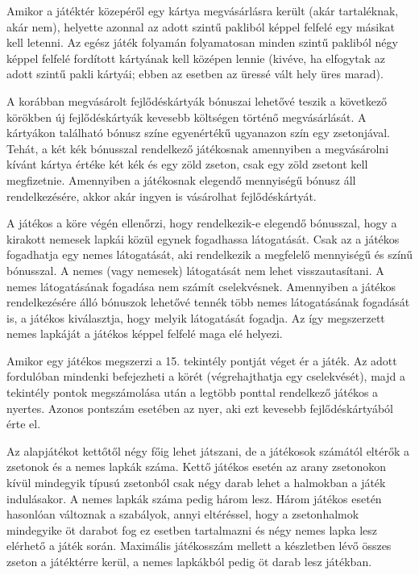 Amikor a játéktér közepéről egy kártya megvásárlásra került (akár tartaléknak, akár nem), helyette azonnal az adott szintű pakliból képpel felfelé egy másikat kell letenni. Az egész játék folyamán folyamatosan minden szintű pakliból négy képpel felfelé fordított kártyának kell középen lennie (kivéve, ha elfogytak az adott szintű pakli kártyái; ebben az esetben az üressé vált hely üres marad).


A korábban megvásárolt fejlődéskártyák bónuszai lehetővé teszik a következő körökben új fejlődéskártyák kevesebb költségen történő megvásárlását. A kártyákon található bónusz színe egyenértékű ugyanazon szín egy zsetonjával. Tehát, a két kék bónusszal rendelkező játékosnak amennyiben a megvásárolni kívánt kártya értéke két kék és egy zöld zseton, csak egy zöld zsetont kell megfizetnie. Amennyiben a játékosnak elegendő mennyiségű bónusz áll rendelkezésére, akkor akár ingyen is vásárolhat fejlődéskártyát.


A játékos a köre végén ellenőrzi, hogy rendelkezik-e elegendő bónusszal, hogy a kirakott nemesek lapkái közül egynek fogadhassa látogatását. Csak az a játékos fogadhatja egy nemes látogatását, aki rendelkezik a megfelelő mennyiségű és színű bónusszal. A nemes (vagy nemesek) látogatását nem lehet visszautasítani. A nemes látogatásának fogadása nem számít cselekvésnek. Amennyiben a játékos rendelkezésére álló bónuszok lehetővé tennék több nemes látogatásának fogadását is, a játékos kiválasztja, hogy melyik látogatását fogadja. Az így megszerzett nemes lapkáját a játékos képpel felfelé maga elé helyezi.


Amikor egy játékos megszerzi a 15. tekintély pontját véget ér a játék. Az adott fordulóban mindenki befejezheti a körét (végrehajthatja egy cselekvését), majd a tekintély pontok megszámolása után a legtöbb ponttal rendelkező játékos a nyertes. Azonos pontszám esetében az nyer, aki ezt kevesebb fejlődéskártyából érte el.


Az alapjátékot kettőtől négy főig lehet játszani, de a játékosok számától eltérők a zsetonok és a nemes lapkák száma. Kettő játékos esetén az arany zsetonokon kívül mindegyik típusú zsetonból csak négy darab lehet a halmokban a játék indulásakor. A nemes lapkák száma pedig három lesz. Három játékos esetén hasonlóan változnak a szabályok, annyi eltéréssel, hogy a zsetonhalmok mindegyike öt darabot fog ez esetben tartalmazni és négy nemes lapka lesz elérhető a játék során. Maximális játékosszám mellett a készletben lévő összes zseton a játéktérre kerül, a nemes lapkákból pedig öt darab lesz játékban.

